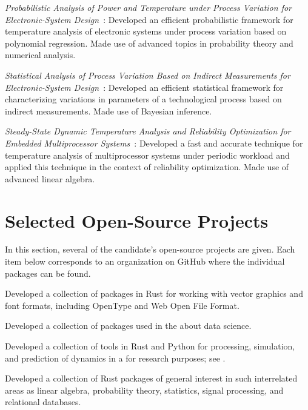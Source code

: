 \documentclass[journal]{IEEEtran}
\begin{document}
\date{2014} \emph{Probabilistic Analysis of Power and Temperature under Process
Variation for Electronic-System Design}~\cite{ukhov2014b}: Developed an
efficient probabilistic framework for temperature analysis of electronic systems
under process variation based on polynomial regression. Made use of advanced
topics in probability theory and numerical analysis.

\date{2014} \emph{Statistical Analysis of Process Variation Based on Indirect
Measurements for Electronic-System Design}~\cite{ukhov2014a}: Developed an
efficient statistical framework for characterizing variations in parameters of a
technological process based on indirect measurements. Made use of Bayesian
inference.

\date{2012} \emph{Steady-State Dynamic Temperature Analysis and Reliability
Optimization for Embedded Multiprocessor Systems}~\cite{ukhov2012}: Developed a
fast and accurate technique for temperature analysis of multiprocessor systems
under periodic workload and applied this technique in the context of reliability
optimization. Made use of advanced linear algebra.

\section{Selected Open-Source Projects} 

In this section, several of the candidate's open-source projects are given. Each
item below corresponds to an organization on GitHub where the individual
packages can be found.

\emph{} Developed
a collection of packages in Rust for working with vector graphics and font
formats, including OpenType and Web Open File Format.

\emph{} Developed a collection of packages used in the
 about data science.

\emph{} Developed a collection of tools in Rust and
Python for processing, simulation, and prediction of dynamics in a
 for research
purposes; see .

\emph{} Developed a collection of Rust packages of general
interest in such interrelated areas as linear algebra, probability theory,
statistics, signal processing, and relational databases.
\end{document}
